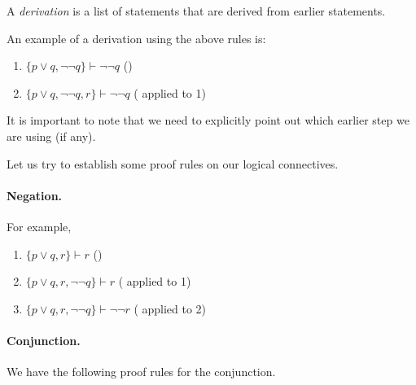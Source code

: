 \begin{definition}
A \textit{derivation} is a list of statements that are derived from earlier statements.
\end{definition}

An example of a derivation using the above rules is:
\begin{enumerate}
    \item $\{p\vee q,\neg\neg q\}\vdash\neg\neg q$ \hfill ()
    \item $\{p\vee q, \neg\neg q, r\}\vdash\neg\neg q$ \hfill ( applied to 1)
\end{enumerate}
It is important to note that we need to explicitly point out which earlier step we are using (if any).

Let us try to establish some proof rules on our logical connectives.

\paragraph{Negation.}

\begin{prooftree}
\end{prooftree}

For example,
\begin{enumerate}
    \item $\{p\vee q,r\}\vdash r$ \hfill ()
    \item $\{p\vee q, r, \neg\neg q\}\vdash r$ \hfill ( applied to 1)
    \item $\{p\vee q, r, \neg\neg q\}\vdash\neg\neg r$ \hfill ( applied to 2)
\end{enumerate}

\paragraph{Conjunction.}

We have the following proof rules for the conjunction.

\begin{prooftree}
\end{prooftree}

